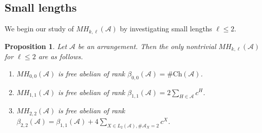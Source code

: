 \documentclass{amsart}
\numberwithin{equation}{section}
\newtheorem{prop}[thm]{Proposition}
\theoremstyle{plain}
\theoremstyle{remark}
\theoremstyle{definition}
\numberwithin{equation}{section}
\newcommand{\A}{\mathcal{A}}
\newcommand{\Ch}{\mathrm{Ch}}
\begin{document}
\subsection{Small lengths}
We begin our study of $MH_{k,\ell}(\A)$ by investigating small lengths $\ell\leq 2$.

\begin{prop}\label{smalllength}
    Let $\A$ be an arrangement. Then the only nontrivial $MH_{k,\ell}(\A)$ for $\ell\leq 2$ are as follows.
    \begin{enumerate}
        \item $MH_{0,0}(\A)$ is free abelian of rank $\beta_{0,0}(\A)=\#\Ch(\A)$.
        \item $MH_{1,1}(\A)$ is free abelian of rank $\beta_{1,1}(\A)=2\sum_{H\in \A}c^H$.
        \item $MH_{2,2}(\A)$ is free abelian of rank $\beta_{2,2}(\A)=\beta_{1,1}(\A)+4\sum_{X\in L_2(\A),\#\A_X=2}c^X$.
    \end{enumerate}
\end{prop}
\end{document}
